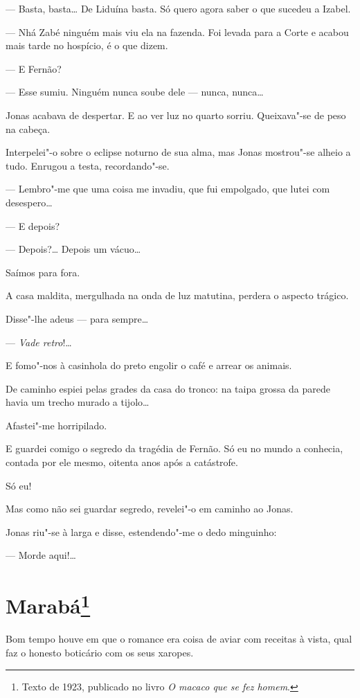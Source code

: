 --- Basta, basta\ldots{} De Liduína basta. Só quero agora saber o que sucedeu
a Izabel.

--- Nhá Zabé ninguém mais viu ela na fazenda. Foi levada para a Corte e
acabou mais tarde no hospício, é o que dizem.

--- E Fernão?

--- Esse sumiu. Ninguém nunca soube dele --- nunca, nunca\ldots{}

Jonas acabava de despertar. E ao ver luz no quarto sorriu. Queixava"-se
de peso na cabeça.

Interpelei"-o sobre o eclipse noturno de sua alma, mas Jonas mostrou"-se
alheio a tudo. Enrugou a testa, recordando"-se.

--- Lembro"-me que uma coisa me invadiu, que fui empolgado, que lutei com
desespero\ldots{}

--- E depois?

--- Depois?\ldots{} Depois um vácuo\ldots{}

Saímos para fora.

A casa maldita, mergulhada na onda de luz matutina, perdera o aspecto
trágico.

Disse"-lhe adeus --- para sempre\ldots{}

--- \emph{Vade retro}!\ldots{}

E fomo"-nos à casinhola do preto engolir o café e arrear os animais.

De caminho espiei pelas grades da casa do tronco: na taipa grossa da
parede havia um trecho murado a tijolo\ldots{}

Afastei"-me horripilado.

E guardei comigo o segredo da tragédia de Fernão. Só eu no mundo a
conhecia, contada por ele mesmo, oitenta anos após a catástrofe.

Só eu!

Mas como não sei guardar segredo, revelei"-o em caminho ao Jonas.

Jonas riu"-se à larga e disse, estendendo"-me o dedo minguinho:

--- Morde aqui!\ldots{}

\chapter{Marabá\footnote[*]{Texto de 1923, publicado no livro \emph{O macaco que se fez homem}.}}

Bom tempo houve em que o romance era coisa de aviar com receitas à
vista, qual faz o honesto boticário com os seus xaropes.

